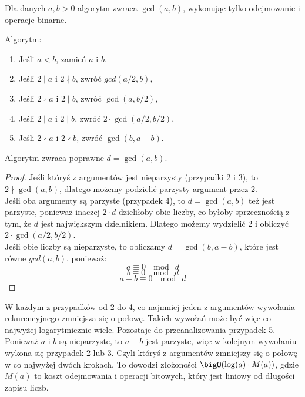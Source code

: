 Dla danych \( a,b > 0 \) algorytm zwraca \( \gcd(a,b) \), wykonując tylko odejmowanie i operacje binarne.

\begin{greyframe}
    Algorytm:
    \begin{enumerate}
    \item Jeśli \( a < b \), zamień \( a \) i \( b \).
    \item Jeśli \( 2 \mid a \) i \( 2 \nmid b \), zwróć \( gcd(a/2, b) \),
    \item Jeśli \( 2 \nmid a \) i \( 2 \mid b \), zwróć \( \gcd(a, b/2) \),
    \item Jeśli \( 2 \mid a \) i \( 2 \mid b \), zwróć \( 2 \cdot \gcd(a/2, b/2) \),
    \item Jeśli \( 2 \nmid a \) i \( 2 \nmid b \), zwróć \( \gcd(b, a - b) \).
    \end{enumerate}
\end{greyframe}

\vspace{1em}\noindent
Algorytm zwraca poprawne \( d = \gcd(a, b) \).
\begin{proof}
    Jeśli któryś z argumentów jest nieparzysty (przypadki 2 i 3), to \( 2 \nmid \gcd(a, b) \), dlatego możemy podzielić parzysty argument przez 2. \\
    Jeśli oba argumenty są parzyste (przypadek 4), to \( d = \gcd(a, b) \) też jest parzyste, ponieważ inaczej \( 2 \cdot d \) dzieliłoby obie liczby, co byłoby sprzecznością z tym, że \( d \) jest największym dzielnikiem. Dlatego możemy wydzielić 2 i obliczyć \( 2 \cdot \gcd(a/2, b/2) \). \\
    Jeśli obie liczby są nieparzyste, to obliczamy \( d = \gcd(b, a - b) \), które jest równe \( gcd(a, b) \), ponieważ:
    \[
        a \equiv 0 \ \mod \ d
    \]
    \[
        b \equiv 0 \ \mod \ d
    \]
    \[
        a - b \equiv 0 \ \mod \ d
    \]
\end{proof}

W każdym z przypadków od 2 do 4, co najmniej jeden z argumentów wywołania rekurencyjnego zmniejsza się o połowę. Takich wywołań może być więc co najwyżej logarytmicznie wiele.
Pozostaje do przeanalizowania przypadek 5. Ponieważ \( a \) i \( b \) są nieparzyste, to \( a - b \) jest parzyste, więc w kolejnym wywołaniu wykona się przypadek 2 lub 3. Czyli któryś z argumentów zmniejszy się o połowę w co najwyżej dwóch krokach.
To dowodzi złożoności \( \bigO(\log(a) \cdot M(a)) \), gdzie \( M(a) \) to koszt odejmowania i operacji bitowych, który jest liniowy od długości zapisu liczb.